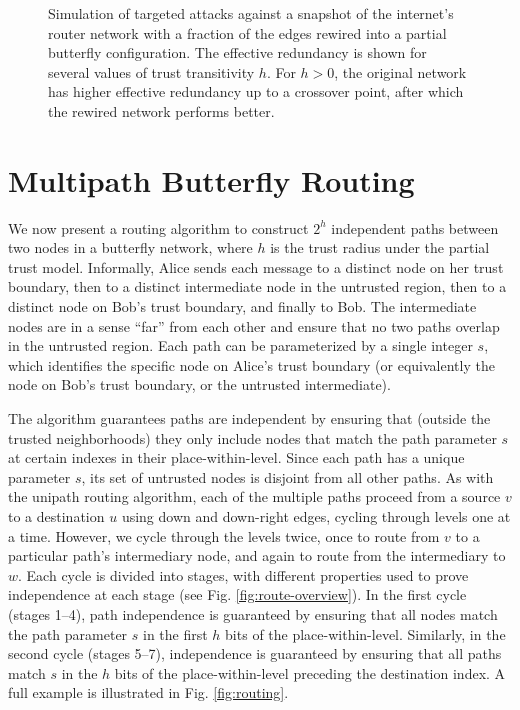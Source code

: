 \documentclass[10pt,letterpaper]{article}
\begin{document}
\begin{figure}[H]
\caption{
Simulation of targeted attacks against a snapshot of the internet's router
network with a fraction of the edges rewired into a partial butterfly configuration.
The effective redundancy is shown for several values of trust transitivity $h$.
For $h>0$, the original network has higher effective redundancy up to a crossover point,
after which the rewired network performs better.
}
\label{fig:mincut}
\end{figure}

\section*{Multipath Butterfly Routing}
\label{sec-bf-route}

We now present a routing algorithm to construct $2^h$ independent paths
between two nodes in a butterfly network,
where $h$ is the trust radius under the partial trust model.
Informally, Alice sends each message to a distinct node on her
trust boundary, then to a distinct intermediate node in the untrusted region,
then to a distinct node on Bob's trust boundary, and finally to Bob.
The intermediate nodes are in a sense ``far'' from each other and ensure that
no two paths overlap in the untrusted region.
Each path can be parameterized by a single integer $s$, which identifies
the specific node on Alice's trust boundary
(or equivalently the node on Bob's trust boundary, or the untrusted intermediate).

The algorithm guarantees paths are independent by ensuring that
(outside the trusted neighborhoods)
they only include
nodes that match the path parameter $s$ at certain indexes in their
place-within-level.
Since each path has a unique parameter $s$,
its set of untrusted nodes is disjoint from all other paths.
As with the unipath routing algorithm,
each of the multiple paths proceed from a source $v$ to a destination $u$
using down and down-right edges,
cycling through levels one at a time.
However, we cycle through the levels twice, once to route from $v$ to a
particular path's intermediary node,
and again to route from the intermediary to $w$.
Each cycle is divided into stages,
with different properties used to prove independence at each stage
(see Fig. \ref{fig:route-overview}).
In the first cycle (stages 1--4), path independence is guaranteed by ensuring that
all nodes match the path parameter $s$ in the first $h$ bits of the place-within-level.
Similarly, in the second cycle (stages 5--7),
independence is guaranteed by ensuring that all paths match $s$ in the
$h$ bits of the place-within-level preceding the destination index.
A full example is illustrated in Fig. \ref{fig:routing}.
\end{document}
